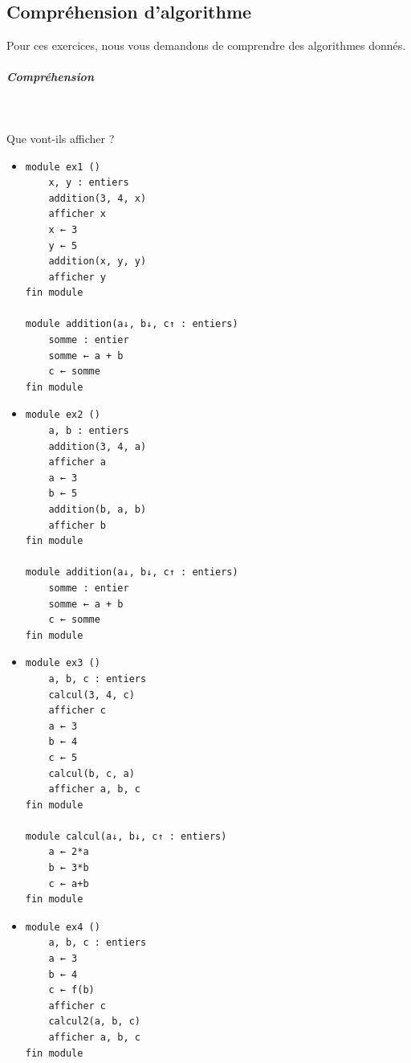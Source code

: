 \documentclass[11pt,a4paper]{article}
\begin{document}
            \par
        \subsection{Compr\'ehension d'algorithme}
          Pour ces exercices, nous vous demandons de comprendre des algorithmes donn\'es. 
          
			
		\subparagraph{Compr\'ehension} 
		
                \textcolor{white}{.} \par
            
							  Que vont-ils afficher ?
              
					\begin{itemize}
				
			\item \begin{verbatim}
module ex1 ()
    x, y : entiers
    addition(3, 4, x)
    afficher x
    x ← 3
    y ← 5
    addition(x, y, y)
    afficher y
fin module

module addition(a↓, b↓, c↑ : entiers)
    somme : entier
    somme ← a + b
    c ← somme
fin module
				\end{verbatim} \textcolor{gray}{\underline{\hspace*{1em}}}  \textcolor{gray}{\underline{\hspace*{1em}}} 
			\item \begin{verbatim}
module ex2 ()
    a, b : entiers
    addition(3, 4, a)
    afficher a
    a ← 3
    b ← 5
    addition(b, a, b)
    afficher b
fin module

module addition(a↓, b↓, c↑ : entiers)
    somme : entier
    somme ← a + b
    c ← somme
fin module
				\end{verbatim} \textcolor{gray}{\underline{\hspace*{1em}}}  \textcolor{gray}{\underline{\hspace*{1em}}} 
			\item \begin{verbatim}
module ex3 ()
    a, b, c : entiers
    calcul(3, 4, c)
    afficher c
    a ← 3
    b ← 4
    c ← 5
    calcul(b, c, a)
    afficher a, b, c
fin module

module calcul(a↓, b↓, c↑ : entiers)
    a ← 2*a
    b ← 3*b
    c ← a+b
fin module
				            \end{verbatim} \textcolor{gray}{\underline{\hspace*{2em}}}  \textcolor{gray}{\underline{\hspace*{2em}}} 
			\item \begin{verbatim}
module ex4 ()
    a, b, c : entiers
    a ← 3
    b ← 4
    c ← f(b)
    afficher c
    calcul2(a, b, c)
    afficher a, b, c
fin module


\end{verbatim}
\end{itemize}
\end{document}
